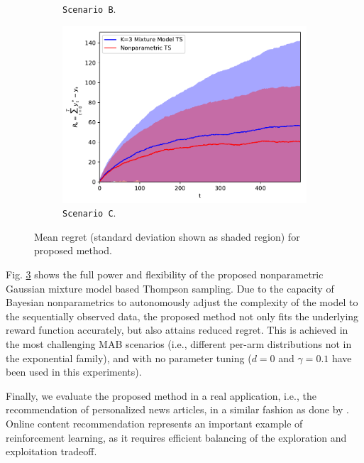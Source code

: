 \documentclass{article}
\newcommand{\ie}{i.e., }
\begin{document}
\begin{figure}[!ht]
\begin{subfigure}[b]{0.325\textwidth}
		\caption{\texttt{Scenario B}.}
		\label{fig:linear_gaussian_mixture_hard}
	\end{subfigure}
	\begin{subfigure}[b]{0.325\textwidth}
		\includegraphics[width=\textwidth]{./figs/linearGaussianMixture/unbalanced/cumregret_priorK3_MCMC_R138}
		\caption{\texttt{Scenario C}.}
		\label{fig:linear_gaussian_mixture_unbalanced}
	\end{subfigure}
	\caption{Mean regret (standard deviation shown as shaded region) for proposed method.}
	\label{fig:linear_gaussian_mixtures}
\end{figure}

\clearpage
Fig. \ref{fig:linear_gaussian_mixtures} shows the full power and flexibility of the proposed nonparametric Gaussian mixture model based Thompson sampling. Due to the capacity of Bayesian nonparametrics to autonomously adjust the complexity of the model to the sequentially observed data, the proposed method not only fits the underlying reward function accurately, but also attains reduced regret. This is achieved in the most challenging MAB scenarios (\ie different per-arm distributions not in the exponential family), and with no parameter tuning ($d=0$ and $\gamma=0.1$ have been used in this experiments).

Finally, we evaluate the proposed method in a real application, \ie the recommendation of personalized news articles, in a similar fashion as done by \citet{ic-Chapelle2011}. Online content recommendation represents an important example of reinforcement learning, as it requires efficient balancing of the exploration and exploitation tradeoff.
\end{document}
